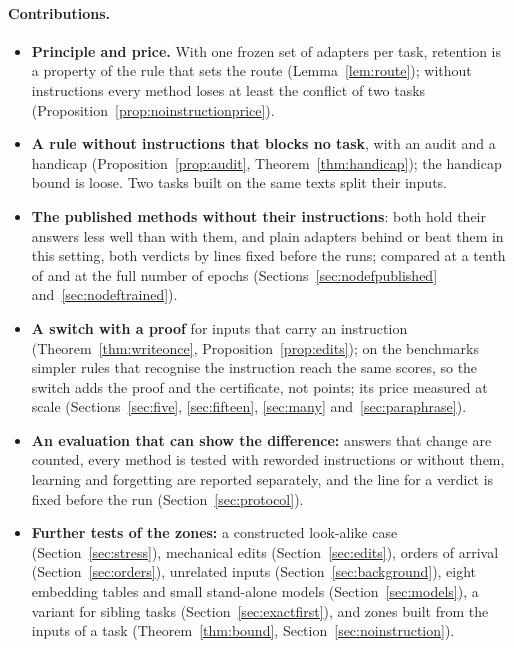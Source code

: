 \paragraph{Contributions.}
\begin{itemize}
  \item \textbf{Principle and price.} With one frozen set of adapters per task, retention is a
  property of the rule that sets the route (Lemma~\ref{lem:route}); without instructions every method
  loses at least the conflict of two tasks (Proposition~\ref{prop:noinstructionprice}).
  \item \textbf{A rule without instructions that blocks no task}, with an audit and a handicap
  (Proposition~\ref{prop:audit}, Theorem~\ref{thm:handicap}); the handicap bound is loose. Two tasks built on the same texts split their inputs.
  \item \textbf{The published methods without their instructions}: both hold their answers less well than with them, and plain adapters behind \recog{} or \handicap{} beat them in this setting, both verdicts by lines fixed before the runs; compared at a tenth of
  and at the full number of epochs (Sections~\ref{sec:nodefpublished} and~\ref{sec:nodeftrained}).
  \item \textbf{A switch with a proof} for inputs that carry an instruction
  (Theorem~\ref{thm:writeonce}, Proposition~\ref{prop:edits}); on the benchmarks simpler rules that recognise the instruction reach the same scores, so the switch adds the proof and the certificate, not points; its price measured at scale
  (Sections~\ref{sec:five}, \ref{sec:fifteen}, \ref{sec:many} and~\ref{sec:paraphrase}).
  \item \textbf{An evaluation that can show the difference:} answers that change are counted, every
  method is tested with reworded instructions or without them, learning and forgetting are reported
  separately, and the line for a verdict is fixed before the run (Section~\ref{sec:protocol}).
  \item \textbf{Further tests of the zones:} a constructed look-alike case (Section~\ref{sec:stress}),
  mechanical edits (Section~\ref{sec:edits}), orders of arrival (Section~\ref{sec:orders}), unrelated
  inputs (Section~\ref{sec:background}), eight embedding tables and small stand-alone models
  (Section~\ref{sec:models}), a variant for sibling tasks (Section~\ref{sec:exactfirst}), and zones built from the inputs of a task (Theorem~\ref{thm:bound}, Section~\ref{sec:noinstruction}).
\end{itemize}

